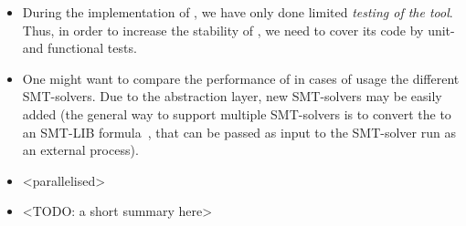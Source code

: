 \begin{itemize}[leftmargin=\parindent]
\item During the implementation of \porthos[2], we have only done limited \textit{testing of the tool}.
Thus, in order to increase the stability of \porthos[2], we need to cover its code by unit- and functional tests.

\item One might want to compare the performance of \porthos[2] in cases of usage the different SMT-solvers.
Due to the \zformula{} abstraction layer, new SMT-solvers may be easily added (the general way to support multiple SMT-solvers is to convert the \zformula{} to an SMT-LIB formula~\cite{smt-lib}, that can be passed as input to the SMT-solver run as an external process).

\item <parallelised>

\item <C processor directives >

<TODO: a short summary here>

\end{itemize}
